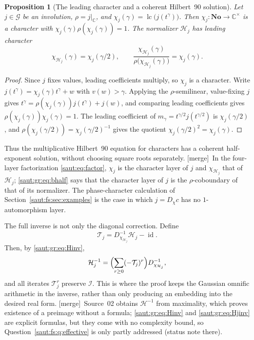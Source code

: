 \documentclass[11pt]{article}
\newtheorem{proposition}[theorem]{Proposition}
\theoremstyle{definition}
\theoremstyle{remark}
\newcommand{\No}{\mathbf{No}}
\newcommand{\C}{\mathbb C}
\newcommand{\id}{\operatorname{id}}
\newcommand{\lc}{\operatorname{lc}}
\newcommand{\Ineg}{\mathcal I}
\newcommand{\mergetag}{\textup{[merge]}}
\numberwithin{equation}{section}
\begin{document}
\begin{proposition}[The leading character and a coherent Hilbert~90 solution]\label{saut:gr:prop:leading}
Let $j\in\mathcal G$ be an involution, $\rho=j|_\C$, and
$\chi_j(\gamma)=\lc\bigl(j(t^\gamma)\bigr)$. Then $\chi_j:\No\to\C^\times$ is a character
with $\chi_j(\gamma)\rho(\chi_j(\gamma))=1$. The normalizer $\mathcal H_j$ has leading
character
\begin{equation}\label{saut:gr:eq:bhalf}
 \chi_{\mathcal H_j}(\gamma)=\chi_j(\gamma/2),\qquad
 \frac{\chi_{\mathcal H_j}(\gamma)}{\rho\bigl(\chi_{\mathcal H_j}(\gamma)\bigr)}=\chi_j(\gamma).
\end{equation}
\end{proposition}
\begin{proof}
Since $j$ fixes values, leading coefficients multiply, so $\chi_j$ is a character.
Write $j(t^\gamma)=\chi_j(\gamma)t^\gamma+w$ with $v(w)>\gamma$. Applying the
$\rho$-semilinear, value-fixing $j$ gives
$t^\gamma=\rho(\chi_j(\gamma))j(t^\gamma)+j(w)$, and comparing leading coefficients gives
$\rho(\chi_j(\gamma))\chi_j(\gamma)=1$. The leading coefficient of
$m_\gamma=t^{\gamma/2}j(t^{\gamma/2})$ is $\chi_j(\gamma/2)$, and
$\rho(\chi_j(\gamma/2))=\chi_j(\gamma/2)^{-1}$ gives the quotient
$\chi_j(\gamma/2)^2=\chi_j(\gamma)$.
\end{proof}

Thus the multiplicative Hilbert~90 equation for characters has a coherent
half-exponent solution, without choosing square roots separately. \mergetag\ In the
four-layer factorization \eqref{saut:eq:factor}, $\chi_j$ is the character layer of $j$
and $\chi_{\mathcal H_j}$ that of $\mathcal H_j$; \eqref{saut:gr:eq:bhalf} says that the
character layer of $j$ is the $\rho$-coboundary of that of its normalizer. The
phase-character calculation of Section~\ref{saut:fs:sec:examples} is the case in which
$j=D_\chi c$ has no $1$-automorphism layer.

The full inverse is not only the diagonal correction. Define
\begin{equation}\label{saut:gr:eq:Tj}
 \mathcal T_j=D_{\chi_{\mathcal H_j}}^{-1}\mathcal H_j-\id .
\end{equation}
Then, by \eqref{saut:gr:eq:Hinv},
\begin{equation}\label{saut:gr:eq:Hjinv}
 \mathcal H_j^{-1}=\Bigl(\sum_{r\ge0}(-\mathcal T_j)^r\Bigr)D_{\chi_{\mathcal H_j}}^{-1},
\end{equation}
and all iterates $\mathcal T_j^r$ preserve $\Ineg$. This is where the proof keeps the
Gaussian omnific arithmetic in the inverse, rather than only producing an embedding
into the desired real form. \mergetag\ Source~02 obtains $\mathcal H^{-1}$ from
maximality, which proves existence of a preimage without a formula;
\eqref{saut:gr:eq:Hinv} and \eqref{saut:gr:eq:Hjinv} are explicit formulas, but they come
with no complexity bound, so Question~\ref{saut:fs:q:effective} is only partly
addressed (status note there).
\end{document}
